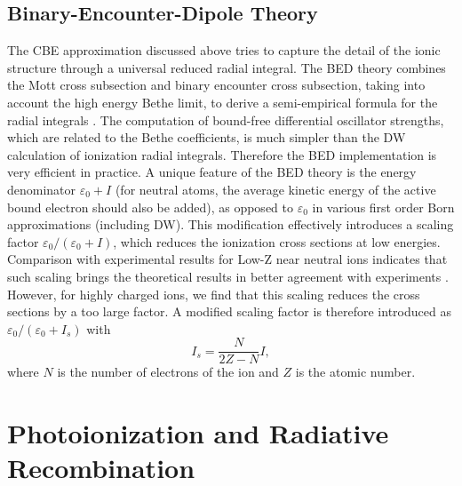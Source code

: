 \subsection{Binary-Encounter-Dipole Theory}
The CBE approximation discussed above tries to capture the detail of the ionic
structure through a universal reduced radial integral. The BED theory combines
the Mott cross subsection and binary encounter cross subsection, taking into
account the high energy Bethe limit, to derive a semi-empirical formula for the
radial integrals \cite{kim94}. The computation of bound-free differential
oscillator strengths, which are related to the Bethe coefficients, is much
simpler than the DW calculation of ionization radial integrals. Therefore the
BED implementation is very efficient in practice. A unique feature of the BED
theory is the energy denominator $\varepsilon_0+I$ (for neutral atoms, the
average kinetic energy of the active bound electron should also be added), as
opposed to $\varepsilon_0$ in various first order Born approximations
(including DW). This modification effectively introduces a scaling factor
$\varepsilon_0/(\varepsilon_0+I)$, which reduces the ionization cross sections
at low energies. Comparison with experimental results for Low-Z near neutral
ions indicates that such scaling brings the theoretical results in better
agreement with experiments \cite{kim94}. However, for highly charged ions, we
find that this scaling reduces the cross sections by a too large factor. A
modified scaling factor is therefore introduced as
$\varepsilon_0/(\varepsilon_0+I_s)$ with
\begin{equation}
I_s = \frac{N}{2Z-N}I,
\end{equation}
where $N$ is the number of electrons of the ion and $Z$ is the atomic
number.


\section{Photoionization and Radiative Recombination}
\label{sec:pirr}
